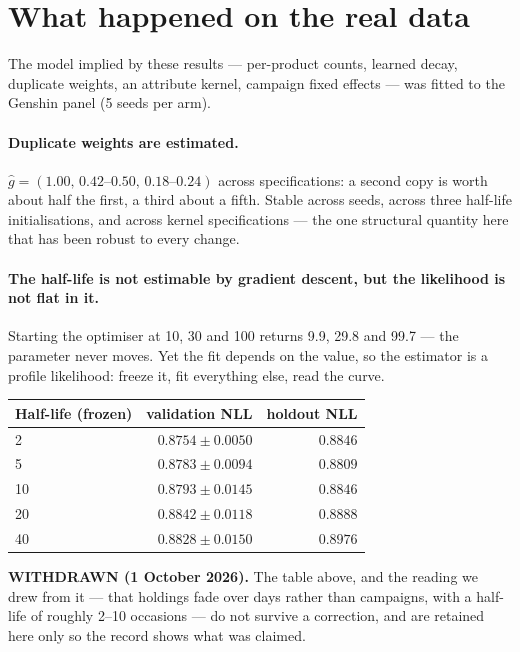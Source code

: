 \documentclass[11pt]{article}
\begin{document}
\section{What happened on the real data}\label{sec:real}

The model implied by these results --- per-product counts, learned decay,
duplicate weights, an attribute kernel, campaign fixed effects --- was fitted to
the Genshin panel (5 seeds per arm).

\paragraph{Duplicate weights are estimated.} $\hat g = (1.00,\,0.42\text{--}0.50,\,
0.18\text{--}0.24)$ across specifications: a second copy is worth about half the
first, a third about a fifth. Stable across seeds, across three half-life
initialisations, and across kernel specifications --- the one structural
quantity here that has been robust to every change.

\paragraph{The half-life is not estimable by gradient descent, but the
likelihood is not flat in it.} Starting the optimiser at 10, 30 and 100 returns
9.9, 29.8 and 99.7 --- the parameter never moves. Yet the fit depends on the
value, so the estimator is a profile likelihood: freeze it, fit everything else,
read the curve.

\begin{center}\small
\begin{tabular}{lrr}
\toprule
Half-life (frozen) & validation NLL & holdout NLL \\
\midrule
2 & $\mathbf{0.8754 \pm 0.0050}$ & $0.8846$ \\
5 & $0.8783 \pm 0.0094$ & $\mathbf{0.8809}$ \\
10 & $0.8793 \pm 0.0145$ & $0.8846$ \\
20 & $0.8842 \pm 0.0118$ & $0.8888$ \\
40 & $0.8828 \pm 0.0150$ & $0.8976$ \\
\bottomrule
\end{tabular}
\end{center}

\noindent \textbf{WITHDRAWN (1 October 2026).} The table above, and the reading
we drew from it --- that holdings fade over days rather than campaigns, with a
half-life of roughly 2--10 occasions --- do not survive a correction, and are
retained here only so the record shows what was claimed.
\end{document}
